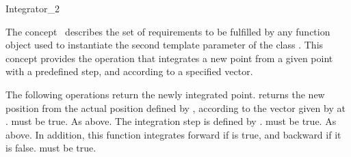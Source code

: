 

\begin{ccRefFunctionObjectConcept}{Integrator_2}


\ccDefinition
  
The concept \ccRefName\ describes the set of requirements to be
fulfilled by any function object used to instantiate the second
template parameter of the class
.  This concept
provides the operation that integrates a new point from a given point
with a predefined step, and according to a specified vector.

\ccTypes
{}
\ccGlue
{}
\ccGlue
{}
\ccGlue
{}
\ccGlue

\ccCreation
{}  %
\ccGlue

\ccOperations
{}
The following operations return the newly integrated point.
{returns the new position from the actual position defined by , according to the vector given by  at .
\ccPrecond {} must be true.}
{As above. The integration step is defined by .
\ccPrecond {} must be true.}
{As above. In addition, this function integrates forward if  is true, and backward if it is false.
\ccPrecond {} must be true.}

\ccHasModels
{} \\
 \\
\end{ccRefFunctionObjectConcept}



